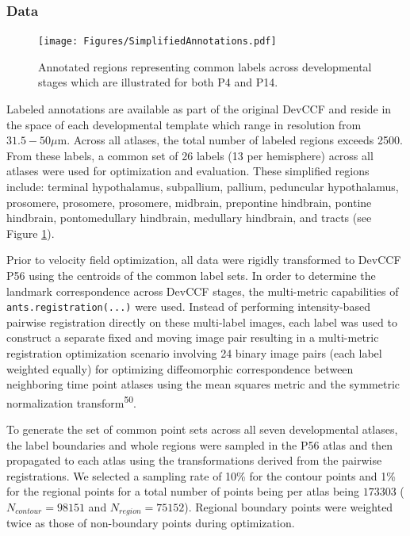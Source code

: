 \documentclass[
  12pt,
]{article}
\begin{document}
\subsubsection{Data}\label{data}

\begin{figure}[!htb]
\centering
\texttt{[image: Figures/SimplifiedAnnotations.pdf]}
\caption{Annotated regions representing common labels across developmental stages which
are illustrated for both P4 and P14.}
\label{fig:simplifiedannotations}
\end{figure}

Labeled annotations are available as part of the original DevCCF and
reside in the space of each developmental template which range in
resolution from \(31.5-50
\mu\)m. Across all atlases, the total number of labeled regions exceeds
2500. From these labels, a common set of 26 labels (13 per hemisphere)
across all atlases were used for optimization and evaluation. These
simplified regions include: terminal hypothalamus, subpallium, pallium,
peduncular hypothalamus, prosomere, prosomere, prosomere, midbrain,
prepontine hindbrain, pontine hindbrain, pontomedullary hindbrain,
medullary hindbrain, and tracts (see Figure
\ref{fig:simplifiedannotations}).

Prior to velocity field optimization, all data were rigidly transformed
to DevCCF P56 using the centroids of the common label sets. In order to
determine the landmark correspondence across DevCCF stages, the
multi-metric capabilities of \texttt{ants.registration(...)} were used.
Instead of performing intensity-based pairwise registration directly on
these multi-label images, each label was used to construct a separate
fixed and moving image pair resulting in a multi-metric registration
optimization scenario involving 24 binary image pairs (each label
weighted equally) for optimizing diffeomorphic correspondence between
neighboring time point atlases using the mean squares metric and the
symmetric normalization transform\textsuperscript{50}.

To generate the set of common point sets across all seven developmental
atlases, the label boundaries and whole regions were sampled in the P56
atlas and then propagated to each atlas using the transformations
derived from the pairwise registrations. We selected a sampling rate of
10\% for the contour points and 1\% for the regional points for a total
number of points being per atlas being \(173303\)
(\(N_{contour} = 98151\) and \(N_{region}=75152\)). Regional boundary
points were weighted twice as those of non-boundary points during
optimization.
\end{document}
